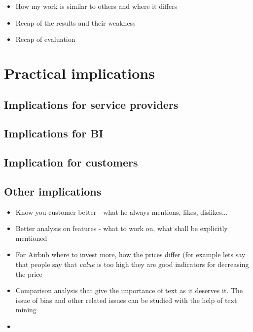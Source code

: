 \begin{itemize}
\item  How my work is similar to others and where it differs
\item Recap of the results and their weakness
\item Recap of evaluation
\end{itemize}

\section{Practical implications}
\subsection{Implications for service providers}
\subsection{Implications for BI}
\subsection{Implication for customers}
\subsection{Other implications}

\begin{itemize}
\item  Know you customer better - what he always mentions, likes, dislikes...
\item Better analysis on features - what to work on, what shall be explicitly mentioned 
\item For Airbnb where to invest more, how the prices differ (for example lets say that people say that \textit{value} is too high they are good indicators for decreasing the price
\item Comparison analysis that give the importance of text as it deserves it. The issue of bias and other related issues can be studied with the help of text mining
\item 
\end{itemize}

